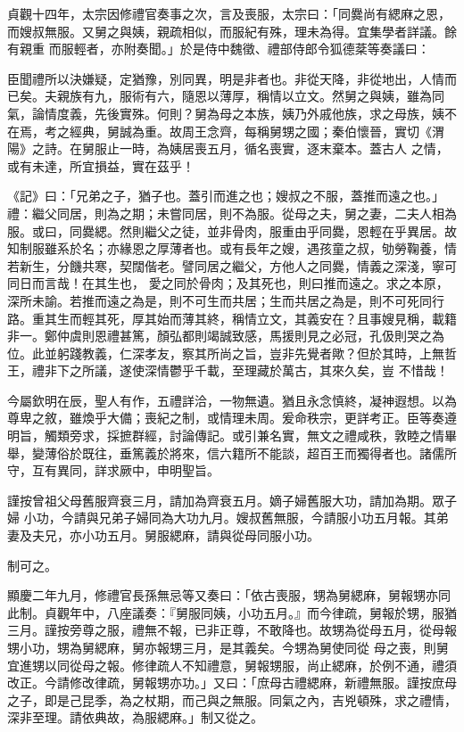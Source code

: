 
\begin{pinyinscope}

 貞觀十四年，太宗因修禮官奏事之次，言及喪服，太宗曰：「同爨尚有緦麻之恩，而嫂叔無服。又舅之與姨，親疏相似，而服紀有殊，理未為得。宜集學者詳議。餘有親重
 而服輕者，亦附奏聞。」於是侍中魏徵、禮部侍郎令狐德棻等奏議曰：



 臣聞禮所以決嫌疑，定猶豫，別同異，明是非者也。非從天降，非從地出，人情而已矣。夫親族有九，服術有六，隨恩以薄厚，稱情以立文。然舅之與姨，雖為同氣，論情度義，先後實殊。何則？舅為母之本族，姨乃外戚他族，求之母族，姨不在焉，考之經典，舅誠為重。故周王念齊，每稱舅甥之國；秦伯懷晉，實切《渭陽》之詩。在舅服止一時，為姨居喪五月，循名喪實，逐末棄本。蓋古人
 之情，或有未達，所宜損益，實在茲乎！



 《記》曰：「兄弟之子，猶子也。蓋引而進之也；嫂叔之不服，蓋推而遠之也。」禮：繼父同居，則為之期；未嘗同居，則不為服。從母之夫，舅之妻，二夫人相為服。或曰，同爨緦。然則繼父之徒，並非骨肉，服重由乎同爨，恩輕在乎異居。故知制服雖系於名；亦緣恩之厚薄者也。或有長年之嫂，遇孩童之叔，劬勞鞠養，情若新生，分饑共寒，契闊偕老。譬同居之繼父，方他人之同爨，情義之深淺，寧可同日而言哉！在其生也，
 愛之同於骨肉；及其死也，則曰推而遠之。求之本原，深所未諭。若推而遠之為是，則不可生而共居；生而共居之為是，則不可死同行路。重其生而輕其死，厚其始而薄其終，稱情立文，其義安在？且事嫂見稱，載籍非一。鄭仲虞則恩禮甚篤，顏弘都則竭誠致感，馬援則見之必冠，孔伋則哭之為位。此並躬踐教義，仁深孝友，察其所尚之旨，豈非先覺者歟？但於其時，上無哲王，禮非下之所議，遂使深情鬱乎千載，至理藏於萬古，其來久矣，豈
 不惜哉！



 今屬欽明在辰，聖人有作，五禮詳洽，一物無遺。猶且永念慎終，凝神遐想。以為尊卑之敘，雖煥乎大備；喪紀之制，或情理未周。爰命秩宗，更詳考正。臣等奏遵明旨，觸類旁求，採摭群經，討論傳記。或引兼名實，無文之禮咸秩，敦睦之情畢舉，變薄俗於既往，垂篤義於將來，信六籍所不能談，超百王而獨得者也。諸儒所守，互有異同，詳求厥中，申明聖旨。



 謹按曾祖父母舊服齊衰三月，請加為齊衰五月。嫡子婦舊服大功，請加為期。眾子婦
 小功，今請與兄弟子婦同為大功九月。嫂叔舊無服，今請服小功五月報。其弟妻及夫兄，亦小功五月。舅服緦麻，請與從母同服小功。



 制可之。



 顯慶二年九月，修禮官長孫無忌等又奏曰：「依古喪服，甥為舅緦麻，舅報甥亦同此制。貞觀年中，八座議奏：『舅服同姨，小功五月。』而今律疏，舅報於甥，服猶三月。謹按旁尊之服，禮無不報，已非正尊，不敢降也。故甥為從母五月，從母報甥小功，甥為舅緦麻，舅亦報甥三月，是其義矣。今甥為舅使同從
 母之喪，則舅宜進甥以同從母之報。修律疏人不知禮意，舅報甥服，尚止緦麻，於例不通，禮須改正。今請修改律疏，舅報甥亦功。」又曰：「庶母古禮緦麻，新禮無服。謹按庶母之子，即是己昆季，為之杖期，而己與之無服。同氣之內，吉兇頓殊，求之禮情，深非至理。請依典故，為服緦麻。」制又從之。




\end{pinyinscope}
